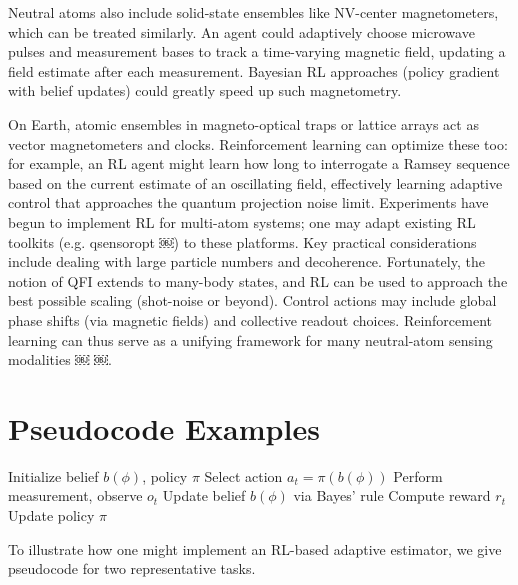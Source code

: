 \documentclass[
    aps,
    prx,
    reprint,
    superscriptaddress,
    amsmath,
    amssymb,
    longbibliography
]{revtex4-2}
\begin{document}
Neutral atoms also include solid-state ensembles like NV-center
magnetometers, which can be treated similarly. An agent could
adaptively choose microwave pulses and measurement bases to track a
time-varying magnetic field, updating a field estimate after each
measurement. Bayesian RL approaches (policy gradient with belief
updates) could greatly speed up such magnetometry.

On Earth, atomic ensembles in magneto-optical traps or lattice arrays
act as vector magnetometers and clocks. Reinforcement learning can
optimize these too: for example, an RL agent might learn how long to
interrogate a Ramsey sequence based on the current estimate of an
oscillating field, effectively learning adaptive control that
approaches the quantum projection noise limit. Experiments have begun
to implement RL for multi-atom systems; one may adapt existing RL
toolkits (e.g. qsensoropt ￼) to these platforms. Key practical
considerations include dealing with large particle numbers and
decoherence. Fortunately, the notion of QFI extends to many-body
states, and RL can be used to approach the best possible scaling
(shot-noise or beyond). Control actions may include global phase
shifts (via magnetic fields) and collective readout
choices. Reinforcement learning can thus serve as a unifying framework
for many neutral-atom sensing modalities ￼ ￼.



\section{Pseudocode Examples}

\begin{algorithm}[t]
\caption{RL-Based Adaptive Phase Estimation}
\begin{algorithmic}[1]
\State Initialize belief $b(\phi)$, policy $\pi$
        \State Select action $a_t=\pi(b(\phi))$
        \State Perform measurement, observe $o_t$
        \State Update belief $b(\phi)$ via Bayes' rule
        \State Compute reward $r_t$
        \State Update policy $\pi$
    \EndFor
\EndFor
\end{algorithmic}
\end{algorithm}


To illustrate how one might implement an RL-based adaptive estimator, we give pseudocode for two representative tasks.
\end{document}
